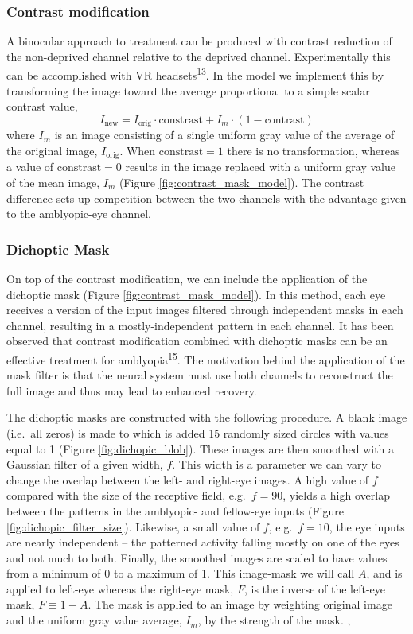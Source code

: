 \documentclass[
]{article}
\begin{document}
\subsubsection{Contrast modification}\label{sec:contrast-modification}

A binocular approach to treatment can be produced with contrast
reduction of the non-deprived channel relative to the deprived channel.
Experimentally this can be accomplished with VR
headsets\textsuperscript{13}. In the model we implement this by
transforming the image toward the average proportional to a simple
scalar contrast value, \[
I_{\text{new}} = I_{\text{orig}} \cdot \text{constrast} + I_m\cdot(1-\text{contrast})
\] where \(I_m\) is an image consisting of a single uniform gray value
of the average of the original image, \(I_{\text{orig}}\). When
\(\text{constrast}=1\) there is no transformation, whereas a value of
\(\text{constrast}=0\) results in the image replaced with a uniform gray
value of the mean image, \(I_m\) (Figure \ref{fig:contrast_mask_model}).
The contrast difference sets up competition between the two channels
with the advantage given to the amblyopic-eye channel.

\subsubsection{Dichoptic Mask}\label{sec:dichoptic-mask}

On top of the contrast modification, we can include the application of
the dichoptic mask (Figure \ref{fig:contrast_mask_model}). In this
method, each eye receives a version of the input images filtered through
independent masks in each channel, resulting in a mostly-independent
pattern in each channel. It has been observed that contrast modification
combined with dichoptic masks can be an effective treatment for
amblyopia\textsuperscript{15}. The motivation behind the application of
the mask filter is that the neural system must use both channels to
reconstruct the full image and thus may lead to enhanced recovery.

The dichoptic masks are constructed with the following procedure. A
blank image (i.e.~all zeros) is made to which is added 15 randomly sized
circles with values equal to 1 (Figure \ref{fig:dichopic_blob}). These
images are then smoothed with a Gaussian filter of a given width, \(f\).
This width is a parameter we can vary to change the overlap between the
left- and right-eye images. A high value of \(f\) compared with the size
of the receptive field, e.g.~\(f=90\), yields a high overlap between the
patterns in the amblyopic- and fellow-eye inputs (Figure
\ref{fig:dichopic_filter_size}). Likewise, a small value of \(f\),
e.g.~\(f=10\), the eye inputs are nearly independent -- the patterned
activity falling mostly on one of the eyes and not much to both.
Finally, the smoothed images are scaled to have values from a minimum of
0 to a maximum of 1. This image-mask we will call \(A\), and is applied
to left-eye whereas the right-eye mask, \(F\), is the inverse of the
left-eye mask, \(F\equiv 1-A\). The mask is applied to an image by
weighting original image and the uniform gray value average, \(I_m\), by
the strength of the mask. ,
\end{document}
